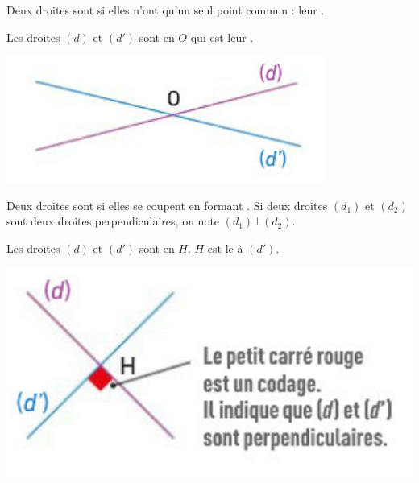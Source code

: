 \begin{mydef}
	Deux droites sont \hspace*{5cm} si elles n'ont qu'un seul point commun : leur \hspace*{8cm}.
\end{mydef}


\begin{myex}
	\begin{multicols}{2}
		Les droites $(d)$ et $(d')$ sont \hspace*{4cm} en $O$ qui est leur \hspace*{8cm}.
		
		\includegraphics[scale=0.5]{img/sec}
	\end{multicols}
	
\end{myex}

\begin{mydef}
	Deux droites sont \hspace*{5cm} si elles se coupent en formant \hspace*{8cm}. Si deux droites $(d_1)$ et $(d_2)$ sont deux droites perpendiculaires, on note $(d_1) \bot (d_2)$.
\end{mydef}

\begin{myex}
	\begin{multicols}{2}
		Les droites $(d)$ et $(d')$ sont \hspace*{6cm} en $H$. $H$ est le \hspace*{8cm} à $(d')$.
		
		\includegraphics[scale=0.6]{img/perp}
	\end{multicols}
	
\end{myex}

